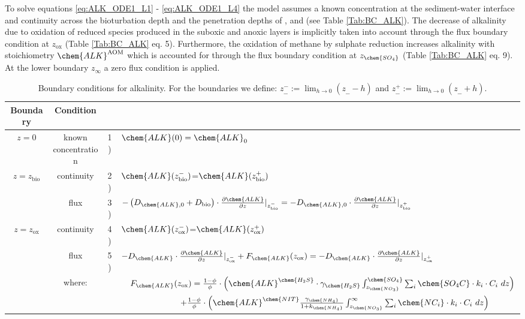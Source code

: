 \documentclass[gmd, manuscript]{copernicus}
\begin{document}
To solve equations \ref{eq:ALK_ODE1_L1} - \ref{eq:ALK_ODE1_L4} the model assumes a known concentration at the sediment-water interface and continuity 
across the bioturbation depth and the penetration depths of ,  and  (see Table \ref{Tab:BC_ALK}). 
The decrease of alkalinity due to oxidation of reduced species produced in the suboxic and anoxic layers is implicitly taken into account 
through the flux boundary condition at $z_{\mathrm{ox}}$ (Table \ref{Tab:BC_ALK} eq. 5). 
Furthermore, the oxidation of methane by sulphate reduction increases alkalinity with stoichiometry $\chem{ALK}^\mathrm{AOM}$ which is accounted for through the flux boundary condition 
at $z_{\chem{SO_4}}$ (Table \ref{Tab:BC_ALK} eq. 9). At the lower boundary $z_\infty$ a zero flux condition is applied. 

\begin{table}[tbp]
\caption{Boundary conditions for alkalinity. For the boundaries we define:  $z^-_{\_\_} := \lim_{h\to0} (z_{\_\_}-h)$ and $z^+_{\_\_} := \lim_{h\to0} (z_{\_\_}+h)$.}
\centering
\begin{tabular}{ |c| c| c l|}
\hline
\textbf{Boundary}& \textbf{Condition}&&\\
\hline
$z=0$& known concentration& 1)& $\chem{ALK}(0)=\chem{ALK}_{0}$  \\
$z=z_{\mathrm{bio}}$&continuity& 2)& $\chem{ALK}(z_{\mathrm{bio}}^-)$=$\chem{ALK}(z_{\mathrm{bio}}^+)$\\
               & flux & 3)& $-\left(D_{\chem{ALK},0}+D_{\mathrm{bio}}\right )\cdot \frac{\partial \chem{ALK}}{\partial z}|_{z_{\mathrm{bio}}^-}=-D_{\chem{ALK},0} \cdot \frac{\partial \chem{ALK}}{\partial z}|_{z_{\mathrm{bio}}^+}$\\
$z=z_{\mathrm{ox}}$& continuity& 4)& $\chem{ALK}(z_{\mathrm{ox}}^-)$=$\chem{ALK}(z_{\mathrm{ox}}^+)$\\
               & flux & 5)& $-D_{\chem{ALK}} \cdot \frac{\partial \chem{ALK}}{\partial z}|_{z_{\mathrm{ox}}^-} +  F_{\chem{ALK}}(z_{\mathrm{ox}})=-D_{\chem{ALK}} \cdot \frac{\partial \chem{ALK}}{\partial z}|_{z_{\mathrm{ox}}^+}$\\
&where: & &$\quad F_{\chem{ALK}}(z_{\mathrm{ox}})=\frac{1-\phi}{\phi} \cdot \left( \chem{ALK}^\chem{H_2S}\cdot \gamma_\chem{H_2S} \int_{z_{\chem{NO_3}}}^{\chem{SO_4}} \sum_i \chem{SO_4C} \cdot k_i \cdot C_i\ dz \right)$\\
& & &$\qquad \qquad \qquad \quad + \frac{1-\phi}{\phi} \cdot \left(\chem{ALK}^\chem{NIT} \frac{\gamma_\chem{NH_4}}{1+k_\chem{NH_4}}\int_{z_{\chem{NO_3}}}^{\infty}  \sum_i \chem{NC_i} \cdot k_i \cdot C_i\ dz \right)$\\            

\end{tabular}
\end{table}
\end{document}
